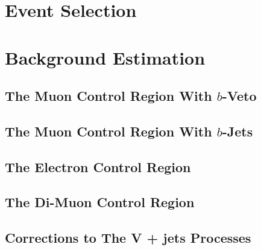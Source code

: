 \documentclass[10pt,twoside,cucitura,classica,english,openany]{toptesi}
\begin{document}


\section{Event Selection}
\label{sec:event-selection-1}




% 

\section{Background Estimation}
\label{sec:backgr-estim}



\subsection{The Muon Control Region With $b$-Veto}
\label{sec:muon-cr-bveto}



\subsection{The Muon Control Region With $b$-Jets}
\label{sec:muon-cr-bjet}



\subsection{The Electron Control Region}
\label{sec:ele-cr}



\subsection{The Di-Muon Control Region}
\label{sec:dimuon-cr}



\subsection{Corrections to The V + jets Processes}
\label{sec:corrections-vjets}
\end{document}
